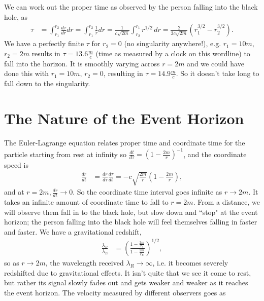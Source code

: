\documentclass[a4paper, 11pt, normalem]{report}
\begin{document}
We can work out the proper time as observed by the person falling into the black hole, as
\begin{align}
    \tau &= \int_{r_1}^{r_2} \frac{d\tau}{dr}dr = \int_{r_1}^{r_2} \frac{1}{\dot{r}}dr = \frac{1}{c\sqrt{2m}}\int_{r_2}^{r_1} r^{1/2}\,dr = \frac{2}{3c\sqrt{2m}}\left(r_1^{3/2} - r_2^{3/2}\right).
\end{align}
We have a perfectly finite $\tau$ for $r_2=0$ (no singularity anywhere!), e.g. $r_1=10m$, $r_2=2m$ results in $\tau=13.6\frac{m}{c}$ (time as measured by a clock on this wordline) to fall into the horizon.
It is smoothly varying across $r=2m$ and we could have done this with $r_1=10m$, $r_2=0$, resulting in $\tau=14.9\frac{m}{c}$.
So it doesn't take long to fall down to the singularity. 

\section{The Nature of the Event Horizon}
The Euler-Lagrange equation relates proper time and coordinate time for the particle starting from rest at infinity so $\frac{dt}{d\tau}=\left(1-\frac{2m}{r}\right)^{-1}$, and the coordinate speed is
\begin{align}
    \frac{dr}{dt} &= \frac{dr}{d\tau}\frac{d\tau}{dt} = -c\sqrt{\frac{2m}{r}}\left(1-\frac{2m}{r}\right),
\end{align}
and at $r=2m,\frac{dr}{dt}\to0$.
So the coordinate time interval goes infinite as $r\to2m$. 
It takes an infinite amount of coordinate time to fall to $r=2m$. 
From a distance, we will observe them fall in to the black hole, but slow down and ``stop" at the event horizon; the person falling into the black hole will feel themselves falling in faster and faster.
We have a gravitational redshift,
\begin{align}
    \frac{\lambda_R}{\lambda_E} &= \left(\frac{1-\frac{2m}{r_2}}{1-\frac{2m}{r_E}}\right)^{1/2},
\end{align}
so as $r\to2m$, the wavelength received $\lambda_R\to\infty$, i.e. it becomes severely redshifted due to gravitational effects.
It isn't quite that we see it come to rest, but rather its signal slowly fades out and gets weaker and weaker as it reaches the event horizon.
The velocity measured by different observers goes as
\begin{figure}[H]
    \centering
\end{figure}
\end{document}
